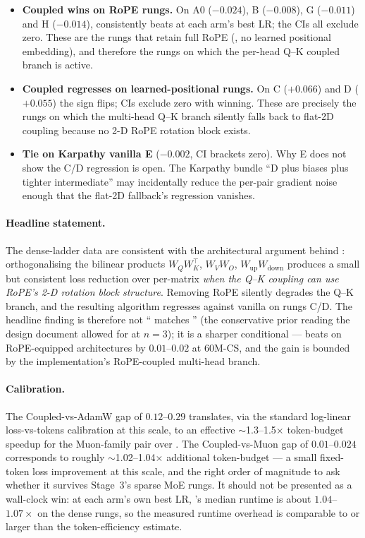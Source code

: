 \begin{itemize}
\item \textbf{Coupled wins on RoPE rungs.} On A0 ($-0.024$\nats), B ($-0.008$\nats), G ($-0.011$\nats) and H ($-0.014$\nats), \optCoupled{} consistently beats \optMuon{} at each arm's best LR; the CIs all exclude zero. These are the rungs that retain full RoPE (, no learned positional embedding), and therefore the rungs on which the per-head Q--K coupled branch is active.

\item \textbf{Coupled regresses on learned-positional rungs.} On C ($+0.066$\nats) and D ($+0.055$\nats) the sign flips; CIs exclude zero with \optMuon{} winning. These are precisely the rungs on which the multi-head Q--K branch silently falls back to flat-2D coupling because no 2-D RoPE rotation block exists.

\item \textbf{Tie on Karpathy vanilla E} ($-0.002$\nats, CI brackets zero). Why E does not show the C/D regression is open. The Karpathy bundle ``D plus biases plus tighter intermediate'' may incidentally reduce the per-pair gradient noise enough that the flat-2D fallback's regression vanishes.
\end{itemize}

\paragraph{Headline statement.}
The dense-ladder data are consistent with the architectural argument behind \optCoupled{}: orthogonalising the bilinear products $W_Q W_K^{\top}$, $W_V W_O$, $W_{\text{up}} W_{\text{down}}$ produces a small but consistent loss reduction over per-matrix \optMuon{} \emph{when the Q--K coupling can use RoPE's 2-D rotation block structure}. Removing RoPE silently degrades the Q--K branch, and the resulting algorithm regresses against vanilla \optMuon{} on rungs C/D. The headline finding is therefore not ``\optCoupled{} matches \optMuon{}'' (the conservative prior reading the design document allowed for at $n{=}3$); it is a sharper conditional --- \optCoupled{} beats \optMuon{} on RoPE-equipped architectures by $0.01$--$0.02$\nats{} at 60M-CS, and the gain is bounded by the implementation's RoPE-coupled multi-head branch.

\paragraph{Calibration.}
The Coupled-vs-AdamW gap of $0.12$--$0.29$\nats{} translates, via the standard log-linear loss-vs-tokens calibration at this scale, to an effective $\sim$1.3--1.5$\times$ token-budget speedup for the Muon-family pair over \optAdamW{}. The Coupled-vs-Muon gap of $0.01$--$0.024$\nats{} corresponds to roughly $\sim$1.02--1.04$\times$ additional token-budget --- a small fixed-token loss improvement at this scale, and the right order of magnitude to ask whether it survives Stage~3's sparse MoE rungs. It should not be presented as a wall-clock win: at each arm's own best LR, \optCoupled{}'s median runtime is about $1.04$--$1.07\times$ \optMuon{} on the dense rungs, so the measured runtime overhead is comparable to or larger than the token-efficiency estimate.
